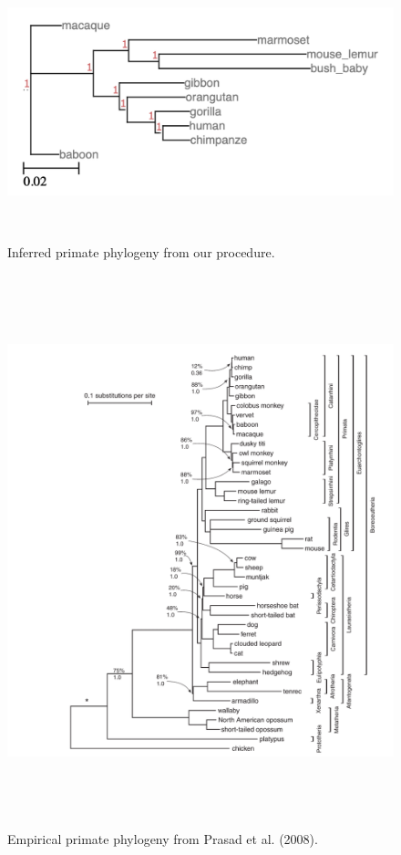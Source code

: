 \documentclass[a4paper]{article}
\begin{document}
\begin{figure}[H]
  \includegraphics[width=\textwidth,height=8cm]{inferred_tree.png}
  \caption{Inferred primate phylogeny from our procedure.}
\end{figure}
\begin{figure}[H]
  \includegraphics[width=\textwidth,height=16cm]{empirical_tree.png}
  \caption{Empirical primate phylogeny from Prasad et al. (2008).}
\end{figure}
\end{document}
